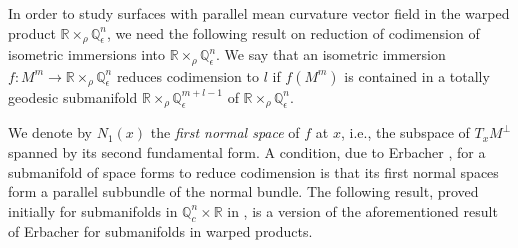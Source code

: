 \documentclass[11pt,a4paper]{article}
\numberwithin{equation}{section}
\newcommand{\R}{\mathbb{R}}
\newcommand{\Q}{\mathbb{Q}}
\newcommand{\e}{\epsilon}
\newcommand{\WP}{\R\times_{\rho}\Q^n_{\epsilon}}
\newcommand{\co}{\colon}
\begin{document}
In order to study surfaces with parallel mean curvature vector field in the warped product $\WP$, we need the following result on reduction of codimension of isometric immersions into $\WP$. We say that an isometric immersion $f\co M^m\to\WP$ reduces codimension to $l$ if $f(M^m)$ is contained in a totally geodesic submanifold $\R\times_\rho\Q^{m+l-1}_\e$ of $\WP$.

\vspace{.2cm}

We denote by $N_1(x)$ the {\em first normal space} of $f$ at $x$, i.e., the subspace of $T_xM^\perp$ spanned by its second fundamental form. A condition, due to Erbacher \cite{Er}, for a submanifold of space forms to reduce codimension is that its first normal spaces form a parallel subbundle of the normal bundle. The following result, proved initially for submanifolds in $\mathbb{Q}^n_c \times \mathbb{R}$ in \cite{MeTo}, is a version of the aforementioned result of Erbacher for submanifolds in warped products.
\end{document}
